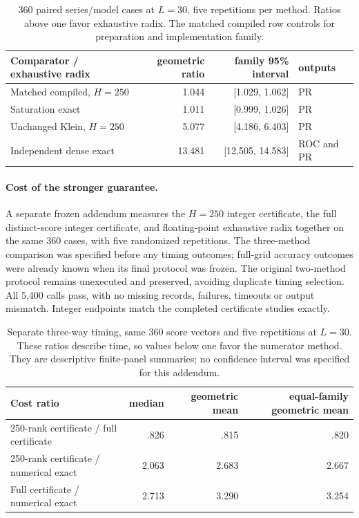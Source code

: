 \begin{table}[t]
\caption{360 paired series/model cases at $L=30$, five repetitions per
method. Ratios above one favor exhaustive radix. The matched compiled
row controls for preparation and implementation family.}
\label{tab:matched-costs}

\centering\small
\begin{tabular}{lrrl}
\toprule
Comparator / exhaustive radix & geometric ratio & family 95\% interval & outputs\\
\midrule
Matched compiled, $H=250$ & 1.044 & [1.029, 1.062] & PR\\
Saturation exact & 1.011 & [0.999, 1.026] & PR\\
Unchanged Klein, $H=250$ & 5.077 & [4.186, 6.403] & PR\\
Independent dense exact & 13.481 & [12.505, 14.583] & ROC and PR\\
\bottomrule
\end{tabular}

\end{table}


\paragraph{Cost of the stronger guarantee.}
A separate frozen addendum measures the $H=250$ integer certificate,
the full distinct-score integer certificate, and floating-point exhaustive
radix together on the same 360 cases, with five randomized repetitions.
The three-method comparison was specified before any timing outcomes;
full-grid accuracy outcomes were already known when its final protocol
was frozen. The original two-method protocol remains unexecuted and
preserved, avoiding duplicate timing selection. All 5,400 calls pass,
with no missing records, failures, timeouts or output mismatch. Integer
endpoints match the completed certificate studies exactly.

\begin{table}[t]
\caption{Separate three-way timing, same 360 score vectors and five
repetitions at $L=30$. These ratios describe time, so values below one
favor the numerator method. They are descriptive finite-panel summaries;
no confidence interval was specified for this addendum.}
\label{tab:certificate-cost}

\centering\small
\begin{tabular}{lrrr}
\toprule
Cost ratio & median & geometric mean & equal-family geometric mean\\
\midrule
250-rank certificate / full certificate & .826 & .815 & .820\\
250-rank certificate / numerical exact & 2.063 & 2.683 & 2.667\\
Full certificate / numerical exact & 2.713 & 3.290 & 3.254\\
\bottomrule
\end{tabular}

\end{table}

